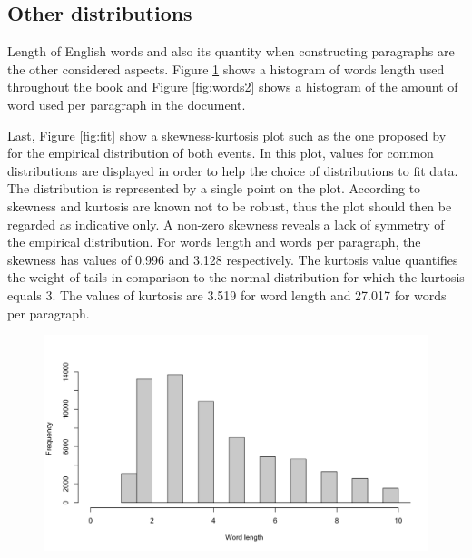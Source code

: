 \documentclass[10pt,leter,openany]{article}
\begin{document}
\subsection{Other distributions}

 Length of English words and also its quantity when constructing paragraphs are the other considered aspects. Figure \ref{fig:words1} shows a histogram of words length used throughout the book and Figure \ref{fig:words2} shows a histogram of the amount of word used per paragraph in the document. 
 
 Last, Figure \ref{fig:fit} show a skewness-kurtosis plot such as the one proposed by \citet{cullen1999probabilistic} for the empirical distribution of both events. In this plot, values for common distributions are displayed in order to help the choice of distributions to fit data. The distribution is represented by a single point on the plot. According to \citet{delignette2015fitdistrplus} skewness and kurtosis are known not to be robust, thus the plot should then be regarded as indicative only. A non-zero skewness reveals a lack of symmetry of the empirical distribution. For words length and words per paragraph, the skewness has values of 0.996 and 3.128 respectively.   The kurtosis value quantifies the weight of tails in comparison to the normal distribution for which the kurtosis equals 3. The values of kurtosis are 3.519 for word length and 27.017 for words per paragraph.

\begin{figure}
	\begin{center}
		\includegraphics[scale=0.3]{img/word_lengths}
		\label{fig:words1}
	\end{center}
\end{figure}
\end{document}
